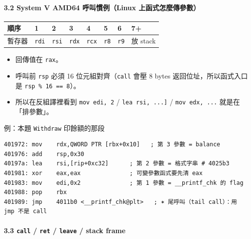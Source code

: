 \documentclass[10pt,a4paper]{article}
\newcounter{none}
\providecommand{\tightlist}{%
  \setlength{\itemsep}{0pt}\setlength{\parskip}{0pt}}
\begin{document}
\paragraph{3.2 System V AMD64 呼叫慣例（Linux
上函式怎麼傳參數）}\label{system-v-amd64-ux547cux53ebux6163ux4f8blinux-ux4e0aux51fdux5f0fux600eux9ebcux50b3ux53c3ux6578}

{\def\LTcaptype{none} %
\begin{longtable}[]{@{}llllllll@{}}
\toprule\noalign{}
順序 & 1 & 2 & 3 & 4 & 5 & 6 & 7+ \\
\midrule\noalign{}
\endhead
\bottomrule\noalign{}
\endlastfoot
暫存器 & \texttt{rdi} & \texttt{rsi} & \texttt{rdx} & \texttt{rcx} &
\texttt{r8} & \texttt{r9} & 放 stack \\
\end{longtable}
}

\begin{itemize}
\tightlist
\item
  回傳值在 \texttt{rax}。
\item
  呼叫前 \texttt{rsp} 必須 16 位元組對齊（\texttt{call} 會壓 8 bytes
  返回位址，所以函式入口是 \texttt{rsp\ \allowbreak{}\%\allowbreak{}\ \allowbreak{}16\ \allowbreak{}==\ \allowbreak{}8}）。
\item
  所以在反組譯裡看到 \texttt{mov\ \allowbreak{}edi,\allowbreak{}\ \allowbreak{}2} /
  \texttt{lea\ \allowbreak{}rsi,\allowbreak{}\ \allowbreak{}{[}...{]}} / \texttt{mov\ \allowbreak{}edx,\allowbreak{}\ \allowbreak{}...}
  就是在「排參數」。
\end{itemize}

例：本題 \texttt{Withdraw} 印餘額的那段

\begin{Verbatim}[breaklines=true,breakanywhere=true,breakautoindent=false,fontsize=\fontsize{7.0}{9.5}\selectfont]
401972: mov    rdx,QWORD PTR [rbx+0x10]   ; 第 3 參數 = balance
401976: add    rsp,0x30
40197a: lea    rsi,[rip+0xc32]      ; 第 2 參數 = 格式字串 # 4025b3
401981: xor    eax,eax              ; 可變參數函式要先清 eax
401983: mov    edi,0x2              ; 第 1 參數 = __printf_chk 的 flag
401988: pop    rbx
401989: jmp    4011b0 <__printf_chk@plt>   ; ✶ 尾呼叫（tail call）：用 jmp 不是 call
\end{Verbatim}

\paragraph{\texorpdfstring{3.3 \texttt{call} / \texttt{ret} /
\texttt{leave} / stack
frame}{3.3 call / ret / leave / stack frame}}\label{call-ret-leave-stack-frame}
\end{document}

